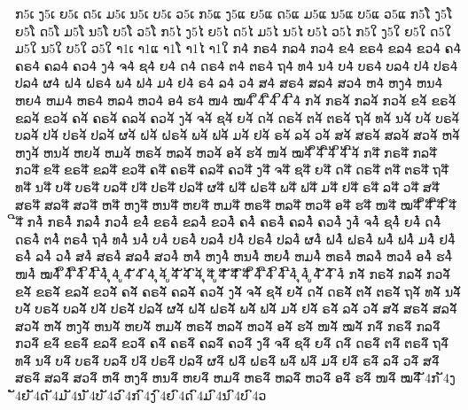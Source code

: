 {%
	ກ5ເ ງ5ເ ຍ5ເ ດ5ເ ມ5ເ ນ5ເ ບ5ເ ວ5ເ
	ກ5ແ ງ5ແ ຍ5ແ ດ5ແ ມ5ແ ນ5ແ ບ5ແ ວ5ແ
	ກ5ໂ ງ5ໂ ຍ5ໂ ດ5ໂ ມ5ໂ ນ5ໂ ບ5ໂ ວ5ໂ
	ກ5ໄ ງ5ໄ ຍ5ໄ ດ5ໄ ມ5ໄ ນ5ໄ ບ5ໄ ວ5ໄ
	ກ5ໃ ງ5ໃ ຍ5ໃ ດ5ໃ ມ5ໃ ນ5ໃ ບ5ໃ ວ5ໃ
	າ1ເ າ1ແ າ1ໂ າ1ໄ າ1ໃ
	ກ4່ ກຣ4່ ກລ4່ ກວ4່ ຂ4່ ຂຣ4່ ຂລ4່ ຂວ4່ ຄ4່ ຄຣ4່ ຄລ4່ ຄວ4່ ງ4່ ຈ4່ ຊ4່ ຍ4່ ດ4່ ດຣ4່ ຕ4່ ຕຣ4່ ຖ4່ ທ4່ ນ4່ ບ4່ ບຣ4່ ບລ4່ ປ4່ ປຣ4່ ປລ4່ ຜ4່ ຝ4່ ຝຣ4່ ພ4່ ຟ4່ ມ4່ ຢ4່ ຣ4່ ລ4່ ວ4່ ສ4່ ສຣ4່ ສລ4່ ສວ4່ ຫ4່ ຫງ4່ ຫນ4່ ຫຍ4່ ຫມ4່ ຫຣ4່ ຫລ4່ ຫວ4່ ອ4່ ຮ4່ ໜ4່ ໝ4່ ຶ4່ ື4່ ິ4່ ີ4່
	ກ4້ ກຣ4້ ກລ4້ ກວ4້ ຂ4້ ຂຣ4້ ຂລ4້ ຂວ4້ ຄ4້ ຄຣ4້ ຄລ4້ ຄວ4້ ງ4້ ຈ4້ ຊ4້ ຍ4້ ດ4້ ດຣ4້ ຕ4້ ຕຣ4້ ຖ4້ ທ4້ ນ4້ ບ4້ ບຣ4້ ບລ4້ ປ4້ ປຣ4້ ປລ4້ ຜ4້ ຝ4້ ຝຣ4້ ພ4້ ຟ4້ ມ4້ ຢ4້ ຣ4້ ລ4້ ວ4້ ສ4້ ສຣ4້ ສລ4້ ສວ4້ ຫ4້ ຫງ4້ ຫນ4້ ຫຍ4້ ຫມ4້ ຫຣ4້ ຫລ4້ ຫວ4້ ອ4້ ຮ4້ ໜ4້ ໝ4້ ຶ4້ ື4້ ິ4້ ີ4້
	ກ4໊ ກຣ4໊ ກລ4໊ ກວ4໊ ຂ4໊ ຂຣ4໊ ຂລ4໊ ຂວ4໊ ຄ4໊ ຄຣ4໊ ຄລ4໊ ຄວ4໊ ງ4໊ ຈ4໊ ຊ4໊ ຍ4໊ ດ4໊ ດຣ4໊ ຕ4໊ ຕຣ4໊ ຖ4໊ ທ4໊ ນ4໊ ບ4໊ ບຣ4໊ ບລ4໊ ປ4໊ ປຣ4໊ ປລ4໊ ຜ4໊ ຝ4໊ ຝຣ4໊ ພ4໊ ຟ4໊ ມ4໊ ຢ4໊ ຣ4໊ ລ4໊ ວ4໊ ສ4໊ ສຣ4໊ ສລ4໊ ສວ4໊ ຫ4໊ ຫງ4໊ ຫນ4໊ ຫຍ4໊ ຫມ4໊ ຫຣ4໊ ຫລ4໊ ຫວ4໊ ອ4໊ ຮ4໊ ໜ4໊ ໝ4໊ ຶ4໊ ື4໊ ິ4໊ ີ4໊
	ກ4໋໋ ກຣ4໋໋ ກລ4໋໋ ກວ4໋໋ ຂ4໋໋ ຂຣ4໋໋ ຂລ4໋໋ ຂວ4໋໋ ຄ4໋໋ ຄຣ4໋໋ ຄລ4໋໋ ຄວ4໋໋ ງ4໋໋ ຈ4໋໋ ຊ4໋໋ ຍ4໋໋ ດ4໋໋ ດຣ4໋໋ ຕ4໋໋ ຕຣ4໋໋ ຖ4໋໋ ທ4໋໋ ນ4໋໋ ບ4໋໋ ບຣ4໋໋ ບລ4໋໋ ປ4໋໋ ປຣ4໋໋ ປລ4໋໋ ຜ4໋໋ ຝ4໋໋ ຝຣ4໋໋ ພ4໋໋ ຟ4໋໋ ມ4໋໋ ຢ4໋໋ ຣ4໋໋ ລ4໋໋ ວ4໋໋ ສ4໋໋ ສຣ4໋໋ ສລ4໋໋ ສວ4໋໋ ຫ4໋໋ ຫງ4໋໋ ຫນ4໋໋ ຫຍ4໋໋ ຫມ4໋໋ ຫຣ4໋໋ ຫລ4໋໋ ຫວ4໋໋ ອ4໋໋ ຮ4໋໋ ໜ4໋໋ ໝ4໋໋ ຶ4໋໋ ື4໋໋ ິ4໋໋ ີ4໋໋
	 ຸ4່ ູ4່ ັ4່ ົ4່
	 ຸ4້ ູ4້ ັ4້ ົ4້	
	 ຸ4໊ ູ4໊ ັ4໊ ົ4໊
	 ຶ4໋ ື4໋ ິ4໋ ີ4໋ ຸ4໋ ູ4໋ ັ4໋ ົ4໋
	ກ4ັ ກຣ4ັ ກລ4ັ ກວ4ັ ຂ4ັ ຂຣ4ັ ຂລ4ັ ຂວ4ັ ຄ4ັ ຄຣ4ັ ຄລ4ັ ຄວ4ັ ງ4ັ ຈ4ັ ຊ4ັ ຍ4ັ ດ4ັ ດຣ4ັ ຕ4ັ ຕຣ4ັ ຖ4ັ ທ4ັ ນ4ັ ບ4ັ ບຣ4ັ ບລ4ັ ປ4ັ ປຣ4ັ ປລ4ັ ຜ4ັ ຝ4ັ ຝຣ4ັ ພ4ັ ຟ4ັ ມ4ັ ຢ4ັ ຣ4ັ ລ4ັ ວ4ັ ສ4ັ ສຣ4ັ ສລ4ັ ສວ4ັ ຫ4ັ ຫງ4ັ ຫນ4ັ ຫຍ4ັ ຫມ4ັ ຫຣ4ັ ຫລ4ັ ຫວ4ັ ອ4ັ ຮ4ັ ໜ4ັ ໝ4ັ
	ກ4ົ ກຣ4ົ ກລ4ົ ກວ4ົ ຂ4ົ ຂຣ4ົ ຂລ4ົ ຂວ4ົ ຄ4ົ ຄຣ4ົ ຄລ4ົ ຄວ4ົ ງ4ົ ຈ4ົ ຊ4ົ ຍ4ົ ດ4ົ ດຣ4ົ ຕ4ົ ຕຣ4ົ ຖ4ົ ທ4ົ ນ4ົ ບ4ົ ບຣ4ົ ບລ4ົ ປ4ົ ປຣ4ົ ປລ4ົ ຜ4ົ ຝ4ົ ຝຣ4ົ ພ4ົ ຟ4ົ ມ4ົ ຢ4ົ ຣ4ົ ລ4ົ ວ4ົ ສ4ົ ສຣ4ົ ສລ4ົ ສວ4ົ ຫ4ົ ຫງ4ົ ຫນ4ົ ຫຍ4ົ ຫມ4ົ ຫຣ4ົ ຫລ4ົ ຫວ4ົ ອ4ົ ຮ4ົ ໜ4ົ ໝ4ົ
	ັ4ກ ັ4ງ ັ4ຍ ັ4ດ ັ4ມ ັ4ນ ັ4ບ ັ4ວ
	ົ4ກ ົ4ງ ົ4ຍ ົ4ດ ົ4ມ ົ4ນ ົ4ບ ົ4ວ
}
